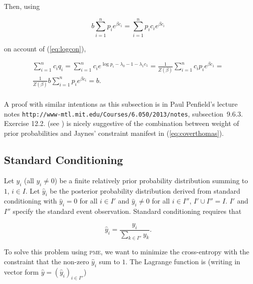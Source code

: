 \documentclass[phd,12pt,oneside]{ubcthesis}
\begin{document}
{\noindent}Then, using 

\begin{equation}
  \label{eq:kexootha}
  b\sum_{i=1}^{n}p_{i}e^{\beta{}c_{i}}=\sum_{i=1}^{n}p_{i}c_{i}e^{\beta{}c_{i}}
\end{equation}

{\noindent}on account of (\ref{eq:logcon}), 

\begin{equation}
  \label{eq:ayohgeix}
  \begin{array}{l}
\displaystyle \sum_{i=1}^{n}c_{i}q_{i}=\sum_{i=1}^{n}c_{i}e^{\log{}p_{i}-\lambda_{0}-1-\lambda_{1}c_{1}}=\frac{1}{Z(\beta)}\sum_{i=1}^{n}c_{i}p_{i}e^{\beta{}c_{1}}= \\
\displaystyle \frac{1}{Z(\beta)}b\sum_{i=1}^{n}p_{i}e^{\beta{}c_{i}}=b. \\
  \end{array}
\end{equation}

{\noindent}A proof with similar intentions as this subsection is in
Paul Penfield's lecture notes
\texttt{http://www-mtl.mit.edu/Courses/6.050/2013/notes},
subsection~9.6.3. Exercise 12.2. (see )
is nicely suggestive of the combination between weight of prior
probabilities and Jaynes' constraint mani\-fest in
(\ref{eq:coverthomas}).

\subsection{Standard Conditioning}
\label{subsec:yeequika}

Let $y_{i}$ (all $y_{i}\neq{}0$) be a finite relatively prior
probability distribution summing to $1$, $i\in{}I$. Let $\hat{y}_{i}$
be the posterior probability distribution derived from standard
conditioning with $\hat{y}_{i}=0$ for all $i\in{}I'$ and
$\hat{y}_{i}\neq{}0$ for all $i\in{}I''$, $I'\cup{}I''=I$. $I'$ and
$I''$ specify the standard event observation. Standard conditioning
requires that

\begin{equation}
  \label{eq:sc}
  \hat{y}_{i}=\frac{y_{i}}{\sum_{k\in{}I''}y_{k}}.
\end{equation}

{\noindent}To solve this problem using \textsc{pme}, we want to minimize the
cross-entropy with the constraint that the non-zero $\hat{y}_{i}$ sum to
$1$. The Lagrange function is (writing in vector form
$\hat{y}=(\hat{y}_{i})_{i\in{}I''}$)
\end{document}

